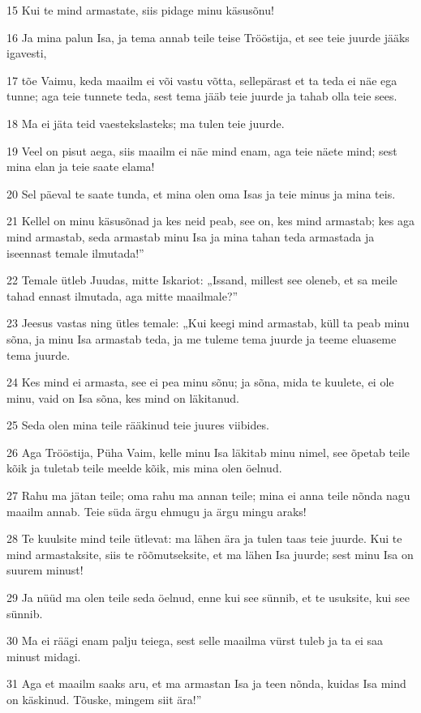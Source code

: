 \par 15 Kui te mind armastate, siis pidage minu käsusõnu!
\par 16 Ja mina palun Isa, ja tema annab teile teise Trööstija, et see teie juurde jääks igavesti,
\par 17 tõe Vaimu, keda maailm ei või vastu võtta, sellepärast et ta teda ei näe ega tunne; aga teie tunnete teda, sest tema jääb teie juurde ja tahab olla teie sees.
\par 18 Ma ei jäta teid vaestekslasteks; ma tulen teie juurde.
\par 19 Veel on pisut aega, siis maailm ei näe mind enam, aga teie näete mind; sest mina elan ja teie saate elama!
\par 20 Sel päeval te saate tunda, et mina olen oma Isas ja teie minus ja mina teis.
\par 21 Kellel on minu käsusõnad ja kes neid peab, see on, kes mind armastab; kes aga mind armastab, seda armastab minu Isa ja mina tahan teda armastada ja iseennast temale ilmutada!”
\par 22 Temale ütleb Juudas, mitte Iskariot: „Issand, millest see oleneb, et sa meile tahad ennast ilmutada, aga mitte maailmale?”
\par 23 Jeesus vastas ning ütles temale: „Kui keegi mind armastab, küll ta peab minu sõna, ja minu Isa armastab teda, ja me tuleme tema juurde ja teeme eluaseme tema juurde.
\par 24 Kes mind ei armasta, see ei pea minu sõnu; ja sõna, mida te kuulete, ei ole minu, vaid on Isa sõna, kes mind on läkitanud.
\par 25 Seda olen mina teile rääkinud teie juures viibides.
\par 26 Aga Trööstija, Püha Vaim, kelle minu Isa läkitab minu nimel, see õpetab teile kõik ja tuletab teile meelde kõik, mis mina olen öelnud.
\par 27 Rahu ma jätan teile; oma rahu ma annan teile; mina ei anna teile nõnda nagu maailm annab. Teie süda ärgu ehmugu ja ärgu mingu araks!
\par 28 Te kuulsite mind teile ütlevat: ma lähen ära ja tulen taas teie juurde. Kui te mind armastaksite, siis te rõõmutseksite, et ma lähen Isa juurde; sest minu Isa on suurem minust!
\par 29 Ja nüüd ma olen teile seda öelnud, enne kui see sünnib, et te usuksite, kui see sünnib.
\par 30 Ma ei räägi enam palju teiega, sest selle maailma vürst tuleb ja ta ei saa minust midagi.
\par 31 Aga et maailm saaks aru, et ma armastan Isa ja teen nõnda, kuidas Isa mind on käskinud. Tõuske, mingem siit ära!”


